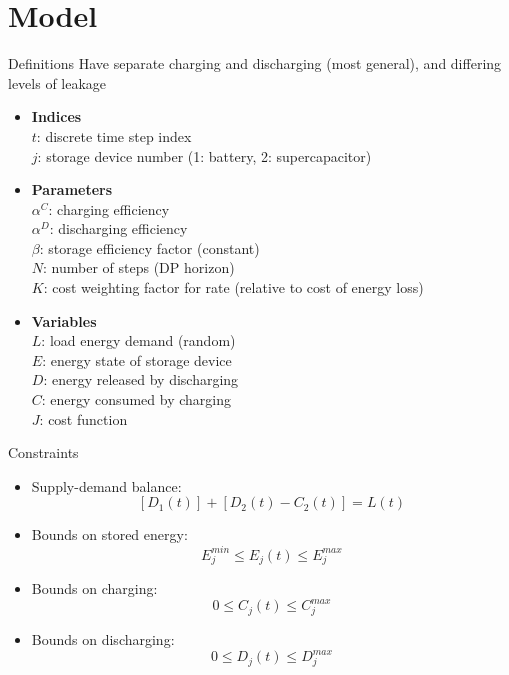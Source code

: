 \documentclass{beamer}
\begin{document}
\section{Model}

\begin{frame}{Definitions}
Have separate charging and discharging (most general), and differing levels of leakage
\begin{itemize}
\item \textbf{Indices}\\
$t$: discrete time step index\\
$j$: storage device number (1: battery, 2: supercapacitor)\\
\item \textbf{Parameters}\\
$\alpha^{C}$: charging efficiency\\
$\alpha^{D}$: discharging efficiency\\
$\beta$: storage efficiency factor (constant)\\
$N$: number of steps (DP horizon)\\
$K$: cost weighting factor for rate (relative to cost of energy loss)\\
\item \textbf{Variables}\\
$L$: load energy demand (random)\\
$E$: energy state of storage device\\
$D$: energy released by discharging\\
$C$: energy consumed by charging\\
$J$: cost function

\end{itemize}
\end{frame}

\begin{frame}{Constraints}
\begin{itemize}
\item Supply-demand balance: 
\begin{equation} \label{eq:BalanceEqn}\left[D_{1}(t)\right] + \left[D_{2}(t) - C_{2}(t)\right] = L(t) \end{equation}

\item Bounds on stored energy: 
\begin{equation}E_{j}^{min}\leq E_{j}(t)\leq E_{j}^{max}\end{equation}
\item Bounds on charging:
\begin{equation}0\leq C_{j}(t)\leq C_{j}^{max}\end{equation}
\item Bounds on discharging:
\begin{equation}0\leq D_{j}(t)\leq D_{j}^{max}\end{equation}
\end{itemize}
\end{frame}
\end{document}
